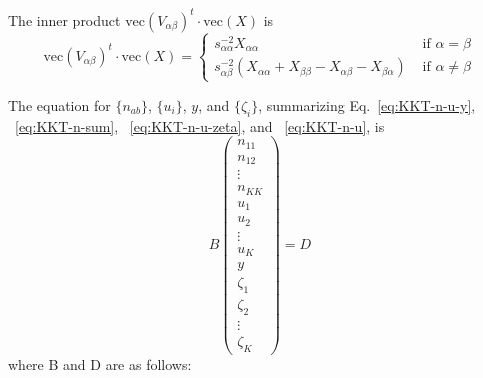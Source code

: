 \documentclass{article}
\newcommand*{\mvec}{\mathbf{\mathrm{vec}}}
\begin{document}
The inner product $\mvec( V_{\alpha\beta})^t \cdot \mvec( X )$ is
\begin{equation}
\mvec( V_{\alpha\beta})^t \cdot \mvec( X ) = \left\{
\begin{array}{cl}
s_{\alpha\alpha}^{-2} X_{\alpha\alpha}   & \text{ if } \alpha = \beta \\
s_{\alpha\beta}^{-2} \left(X_{\alpha\alpha} + X_{\beta\beta} - X_{\alpha\beta} - X_{\beta\alpha}\right) & \text{ if } \alpha \neq \beta
\end{array} \right.
\end{equation}

The equation for $\{n_{ab}\}$, $\{u_i\}$, $y$, and $\{ \zeta_i \}$, summarizing Eq.~\ref{eq:KKT-n-u-y}, ~\ref{eq:KKT-n-sum}, ~\ref{eq:KKT-n-u-zeta}, and ~\ref{eq:KKT-n-u}, is
\begin{equation}
B \left(
\begin{array}{c}
n_{11} \\
n_{12} \\
\vdots \\
n_{KK} \\
u_1 \\
u_2 \\
\vdots \\
u_K \\
y \\
\zeta_1 \\
\zeta_2 \\
\vdots \\
\zeta_K
\end{array} \right) = D
\end{equation}
where B and D are as follows:
\end{document}
